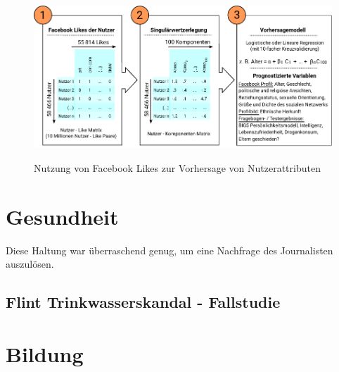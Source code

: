 \begin{figure}%
\centering
\caption{Nutzung von Facebook Likes zur Vorhersage von Nutzerattributen}
\includegraphics[scale=1.0]{Grafiken/Facebook_Likes_Ink.pdf} 
\label{pic:Like_Matrix}
\end{figure}

\section{Gesundheit}

Diese Haltung war überraschend genug, um eine Nachfrage des Journalisten
auszulösen.

\subsection{Flint Trinkwasserskandal - Fallstudie}

\section{Bildung}

